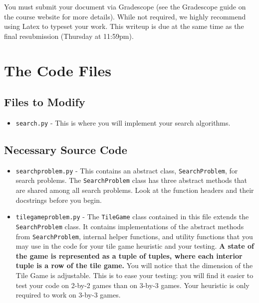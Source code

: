 \documentclass{article}
\begin{document}
You must submit your document via Gradescope (see the Gradescope guide on the course website for more details).
While not required, we highly recommend using Latex to typeset your work.
This writeup is due at the same time as the final resubmission (Thursday at 11:59pm).

\section{The Code Files}
    \subsection{Files to Modify}

\begin{itemize}
    \item \verb|search.py| - This is where you will implement your search algorithms.
 \end{itemize}

\subsection{Necessary Source Code}
\begin{itemize}
    \item \verb|searchproblem.py| - This contains an abstract class, \verb|SearchProblem|, for search problems.
    The \verb|SearchProblem| class has three abstract methods that are shared among all search problems.
    Look at the function headers and their docstrings before you begin.


    \item \verb|tilegameproblem.py| - The \verb|TileGame| class contained in this file extends the \verb|SearchProblem| class.
    It contains implementations of the abstract methods from \verb|SearchProblem|, internal helper functions, and utility functions that you may use in the code for your tile game heuristic and your testing.
    \textbf{A state of the game is represented as a tuple of tuples, where each interior tuple is a row of the tile game.}
    You will notice that the dimension of the Tile Game is adjustable.
    This is to ease your testing: you will find it easier to test your code on 2-by-2 games than on 3-by-3 games.
    Your heuristic is only required to work on 3-by-3 games.

    \end{itemize}
\end{document}
